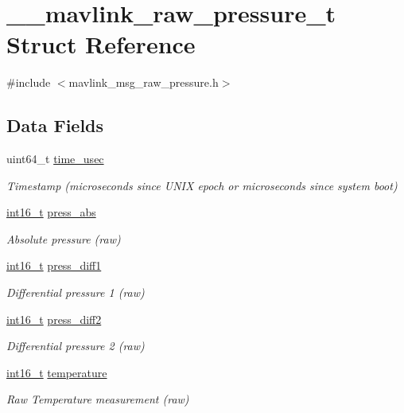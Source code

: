 \hypertarget{struct____mavlink__raw__pressure__t}{\section{\-\_\-\-\_\-mavlink\-\_\-raw\-\_\-pressure\-\_\-t Struct Reference}
\label{struct____mavlink__raw__pressure__t}
}


{\ttfamily \#include $<$mavlink\-\_\-msg\-\_\-raw\-\_\-pressure.\-h$>$}

\subsection*{Data Fields}
\begin{DoxyCompactItemize}
\item 
uint64\-\_\-t \hyperlink{struct____mavlink__raw__pressure__t_a659746eb22bad8e9e29aac0efcba19d2}{time\-\_\-usec}
\begin{DoxyCompactList}\small\item\em Timestamp (microseconds since U\-N\-I\-X epoch or microseconds since system boot) \end{DoxyCompactList}\item 
\hyperlink{stdint_8h_aa343fa3b3d06292b959ffdd4c4703b06}{int16\-\_\-t} \hyperlink{struct____mavlink__raw__pressure__t_aab16fd5b27c766d69df4ffa252d573e3}{press\-\_\-abs}
\begin{DoxyCompactList}\small\item\em Absolute pressure (raw) \end{DoxyCompactList}\item 
\hyperlink{stdint_8h_aa343fa3b3d06292b959ffdd4c4703b06}{int16\-\_\-t} \hyperlink{struct____mavlink__raw__pressure__t_ae53766b9335fa7900b3a72daca467b70}{press\-\_\-diff1}
\begin{DoxyCompactList}\small\item\em Differential pressure 1 (raw) \end{DoxyCompactList}\item 
\hyperlink{stdint_8h_aa343fa3b3d06292b959ffdd4c4703b06}{int16\-\_\-t} \hyperlink{struct____mavlink__raw__pressure__t_a7b832c03aaa2a3f55e309d590d9fc93b}{press\-\_\-diff2}
\begin{DoxyCompactList}\small\item\em Differential pressure 2 (raw) \end{DoxyCompactList}\item 
\hyperlink{stdint_8h_aa343fa3b3d06292b959ffdd4c4703b06}{int16\-\_\-t} \hyperlink{struct____mavlink__raw__pressure__t_a7d57fd80130f0588285f03669bf8c016}{temperature}
\begin{DoxyCompactList}\small\item\em Raw Temperature measurement (raw) \end{DoxyCompactList}\end{DoxyCompactItemize}


